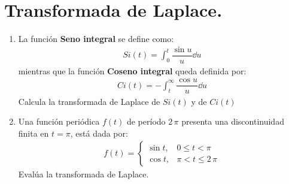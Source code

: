 \section{Transformada de Laplace.}
\begin{enumerate}
\item La función \textbf{Seno integral} se define como:
\begin{align*}
Si(t) = \int_{0}^{t} \dfrac{\sin u }{u} \dd{u}
\end{align*}
mientras que la función \textbf{Coseno integral} queda definida por:
\begin{align*}
Ci(t) = - \int_{t}^{\infty} \dfrac{\cos u }{u} \dd{u}
\end{align*}
Calcula la transformada de Laplace de $Si(t)$ y de $Ci(t)$
\item Una función periódica $f(t)$ de período $2 \, \pi$ presenta una discontinuidad finita en $t = \pi$, está dada por:
\begin{align*}
f(t) = \begin{cases}
\sin t, & 0 \leq t < \pi \\
\cos t, & \pi < t \leq 2 \, \pi
\end{cases}
\end{align*} 
Evalúa la transformada de Laplace.
\end{enumerate}
